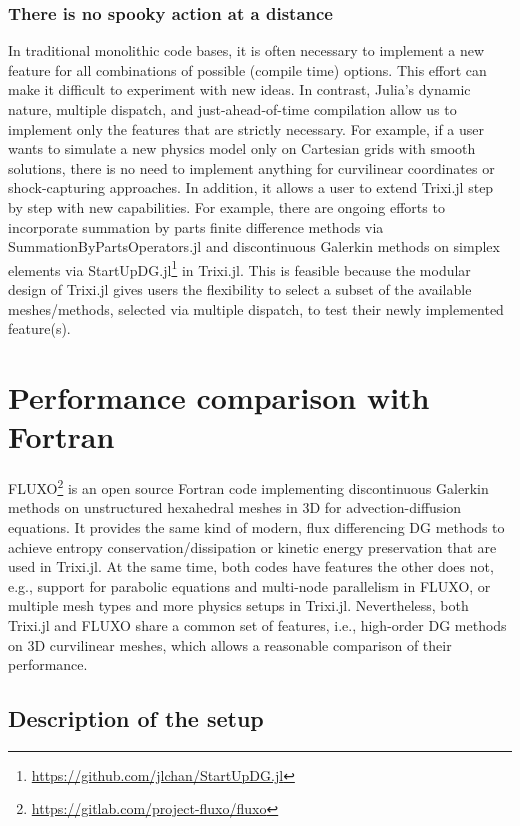 \documentclass[hidelinks]{juliacon} %
\makeatletter
\newcommand{\eg}[0]{{e.g.\@}\xspace}
\newcommand{\ie}[0]{{i.e.\@}\xspace}
\newcommand{\trixi}{Trixi.jl\xspace}
\makeatother
\begin{document}
\subsubsection{There is no spooky action at a distance}

In traditional monolithic code bases, it is often necessary to implement a new
feature for all combinations of possible (compile time) options. This effort
can make it difficult to experiment with new ideas. In contrast, Julia's dynamic
nature, multiple dispatch, and just-ahead-of-time compilation allow us to implement only the features
that are strictly necessary. For example, if a user wants to simulate a new
physics model only on Cartesian grids with smooth solutions, there is no need
to implement anything for curvilinear coordinates or shock-capturing approaches.
In addition, it allows a user to extend \trixi step by step with new capabilities.
For example, there are ongoing efforts to incorporate summation by parts finite
difference methods via SummationByPartsOperators.jl \cite{ranocha2021sbp} and
discontinuous Galerkin methods on simplex elements via StartUpDG.jl\footnote{\url{https://github.com/jlchan/StartUpDG.jl}} in \trixi.
This is feasible because the modular design of \trixi gives users the flexibility to select
a subset of the available meshes/methods, selected via multiple dispatch,
to test their newly implemented feature(s).



\section{Performance comparison with Fortran}
\label{sec:performance-comparison}

FLUXO\footnote{\url{https://gitlab.com/project-fluxo/fluxo}} is an open source
Fortran code implementing discontinuous Galerkin methods on unstructured hexahedral
meshes in 3D for advection-diffusion equations. It provides
the same kind of modern, flux differencing DG methods
to achieve entropy conservation/dissipation or kinetic energy preservation that are used in \trixi.
At the same time, both codes have features the other does not, \eg,
support for parabolic equations and multi-node parallelism in FLUXO,
or multiple mesh types and more physics setups in \trixi. Nevertheless,
both \trixi and FLUXO share a common set of features, \ie, high-order DG
methods on 3D curvilinear meshes, which allows a reasonable comparison of their performance.


\subsection{Description of the setup}
\end{document}
